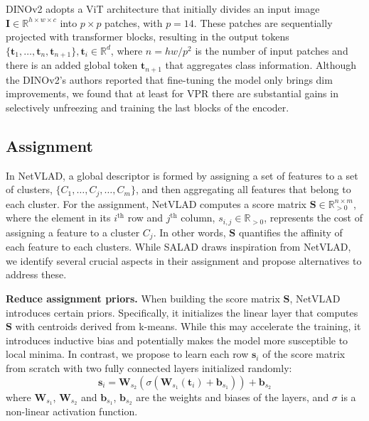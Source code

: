 \documentclass[10pt,twocolumn,letterpaper]{article}
\begin{document}
DINOv2 adopts a ViT architecture that initially divides an input image $\mathbf{I}\in\mathbb{R}^{h\times w\times c}$ into $p\times p$ patches, with $p=14$. These patches are sequentially projected with transformer blocks, resulting in the output tokens $\{\mathbf{t}_1, \dots, \mathbf{t}_{n}, \mathbf{t}_{n+1}\}, \mathbf{t}_i\in\mathbb{R}^{d}$, where $n=hw/p^2$ is the number of input patches and there is an added global token $\mathbf{t}_{n+1}$ that aggregates class information. Although the DINOv2's authors reported that fine-tuning the model only brings dim improvements, we found that at least for VPR there are substantial gains in selectively unfreezing and training the last blocks of the encoder. 



\subsection{Assignment}
\label{subsec:assignment}


In NetVLAD, a global descriptor is formed by assigning a set of features to a set of clusters, $\{C_1, \dots, C_j, \dots, C_m\}$, and then aggregating all features that belong to each cluster. For the assignment, NetVLAD computes a score matrix $\mathbf{S} \in \mathbb{R}_{>0}^{n \times m}$, where the element in its $i^{\text{th}}$ row and $j^{\text{th}}$ column, $s_{i,j} \in \mathbb{R}_{>0}$, represents the cost of assigning a feature to a cluster $C_j$. In other words, $\mathbf{S}$ quantifies the affinity of each feature to each clusters. While SALAD draws inspiration from NetVLAD, we identify several crucial aspects in their assignment and propose alternatives to address these.


\textbf{Reduce assignment priors.} When building the score matrix $\textbf{S}$, NetVLAD introduces certain priors. Specifically, it initializes the linear layer that computes $\textbf{S}$ with centroids derived from k-means. While this may accelerate the training, it introduces inductive bias and potentially makes the model more susceptible to local minima. In contrast, we propose to learn each row $\textbf{s}_i$ of the score matrix from scratch with two fully connected layers initialized randomly:
\begin{equation}
\textbf{s}_i =  \mathbf{W}_{s_2}(\sigma(\mathbf{W}_{s_1}(\textbf{t}_{i}) + \mathbf{b}_{s_1})) + \mathbf{b}_{s_2}
\end{equation}
where $\mathbf{W}_{s_1}$, $\mathbf{W}_{s_2}$ and $\mathbf{b}_{s_1}$, $\mathbf{b}_{s_2}$ are the weights and biases of the layers, and $\sigma$ is a non-linear activation function.
\end{document}
